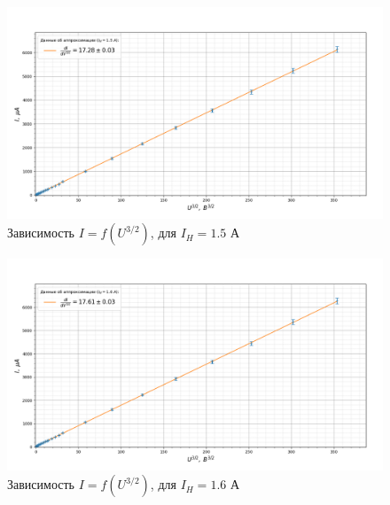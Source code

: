 \documentclass[a4paper, 12pt]{article}%
\begin{document}
	\begin{figure}[H]
		\centering
		\includegraphics[width=0.9\linewidth]{1.5}
		\caption{Зависимость $I=f(U^{3/2})$, для $I_H = 1.5$ А}
		\label{fig:1}
	\end{figure}
	\begin{figure}[H]
		\centering
		\includegraphics[width=0.9\linewidth]{1.6}
		\caption{Зависимость $I=f(U^{3/2})$, для $I_H = 1.6$ А}
		\label{fig:1}
	\end{figure}
\end{document}
